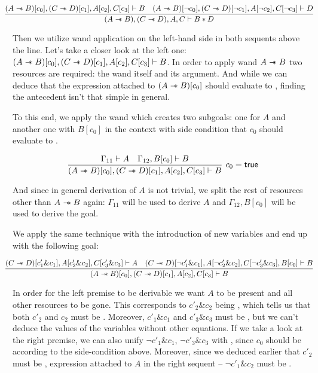 \[\hspace{-0.03\linewidth}
\infer{(A \wand B), (C \wand D), A, C \vdash B \ast D}
      {(A \wand B)[c_0], (C \wand D)[c_1], A[c_2], C[c_3] \vdash B  &
       (A \wand B)[\neg c_0], (C \wand D)[\neg c_1] , A[\neg c_2] , C[\neg c_3] \vdash D}
\]

Then we utilize wand application on the left-hand side in both sequents above the line.
Let's take a closer look at the left one: \((A \mathrel{-\mkern-6mu*} B)[c_0], (C \mathrel{-\mkern-6mu*} D)[c_1], A[c_2], C[c_3] \vdash B\).
In order to apply wand \(A \mathrel{-\mkern-6mu*} B\) two resources are required: the wand itself and its argument.
And while we can deduce that the expression attached to \((A \mathrel{-\mkern-6mu*} B)[c_0]\) should evaluate to \true, finding the antecedent isn't that simple in general.

To this end, we apply the wand which creates two subgoals: one for \(A\) and another one with \(B[c_0]\) in the context with side condition that \(c_0\) should evaluate to \true.

\[
\infer[c_0 = \true]
      {(A \wand B)[c_0], (C \wand D)[c_1],
        A[c_2], C[c_3] \vdash B}
      { \Gamma_{11} \vdash A &
        \Gamma_{12}, B[c_0] \vdash B}
\]

And since in general derivation of \(A\) is not trivial, we split the rest of resources other than \(A \mathrel{-\mkern-6mu*} B\) again: \(\Gamma_{11}\) will be used to derive \(A\) and \(\Gamma_{12}, B[c_0]\) will be used to derive the goal.

We apply the same technique with the introduction of new variables and end up with the following goal:

\[
\hspace{-0.03\linewidth}
\infer{(A \wand B)[c_0], (C \wand D)[c_1], A[c_2], C[c_3] \vdash B}
      {(C \wand D)[c'_1 \& c_1], A[c'_2 \& c_2], C[c'_3 \& c_3] \vdash A &
       (C \wand D)[\neg c'_1 \& c_1], A[\neg c'_2 \& c_2], C[\neg c'_3 \& c_3], B[c_0] \vdash B}
\]

In order for the left premise to be derivable we want \(A\) to be present and all other resources to be gone.
This corresponds to \(c'_2 \& c_2\) being \true, which tells us that both \(c'_2\) and \(c_2\) must be \true.
Moreover, \(c'_1 \& c_1\) and \(c'_3 \& c_3\) must be \false, but we can't deduce the values of the variables without other equations.
If we take a look at the right premise, we can also unify \(\neg c'_1 \& c_1\), \(\neg c'_3 \& c_3\) with \false, since \(c_0\) should be \true according to the side-condition above.
Moreover, since we deduced earlier that \(c'_2\) must be \true, expression attached to \(A\) in the right sequent -- \(\neg c'_1 \& c_2\) must be \false.

